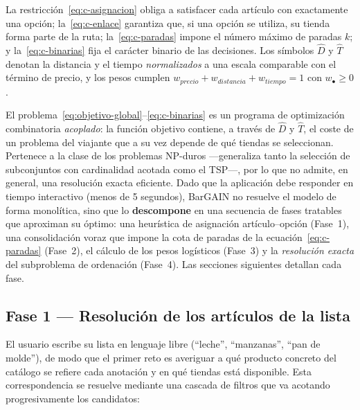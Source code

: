 La restricci\'on~\eqref{eq:c-asignacion} obliga a satisfacer cada art\'iculo con exactamente una
opci\'on; la~\eqref{eq:c-enlace} garantiza que, si una opci\'on se utiliza, su tienda forma parte de
la ruta; la~\eqref{eq:c-paradas} impone el n\'umero m\'aximo de paradas $k$; y
la~\eqref{eq:c-binarias} fija el car\'acter binario de las decisiones. Los s\'imbolos
$\widehat{D}$ y $\widehat{T}$ denotan la distancia y el tiempo \emph{normalizados} a una escala
comparable con el t\'ermino de precio, y los pesos cumplen
$w_{precio} + w_{distancia} + w_{tiempo} = 1$ con $w_\bullet \ge 0$.

El problema~\eqref{eq:objetivo-global}--\eqref{eq:c-binarias} es un programa de optimizaci\'on
combinatoria \emph{acoplado}: la funci\'on objetivo contiene, a trav\'es de $\widehat{D}$ y
$\widehat{T}$, el coste de un problema del viajante que a su vez depende de qu\'e tiendas se
seleccionan. Pertenece a la clase de los problemas NP-duros ---generaliza tanto la selecci\'on de
subconjuntos con cardinalidad acotada como el TSP---, por lo que no admite, en general, una
resoluci\'on exacta eficiente. Dado que la aplicaci\'on debe responder en tiempo interactivo
(menos de 5 segundos), BarGAIN no resuelve el modelo de forma monol\'itica, sino que lo
\textbf{descompone} en una secuencia de fases tratables que aproximan su \'optimo: una heur\'istica
de asignaci\'on art\'iculo--opci\'on (Fase~1), una consolidaci\'on voraz que impone la cota de
paradas de la ecuaci\'on~\eqref{eq:c-paradas} (Fase~2), el c\'alculo de los pesos log\'isticos
(Fase~3) y la \emph{resoluci\'on exacta} del subproblema de ordenaci\'on (Fase~4). Las secciones
siguientes detallan cada fase.

\subsection{Fase 1 --- Resoluci\'on de los art\'iculos de la lista}\label{subsec:resolucion}

El usuario escribe su lista en lenguaje libre (``leche'', ``manzanas'', ``pan de molde''), de modo
que el primer reto es averiguar a qu\'e producto concreto del cat\'alogo se refiere cada anotaci\'on
y en qu\'e tiendas est\'a disponible. Esta correspondencia se resuelve mediante una cascada de
filtros que va acotando progresivamente los candidatos:

